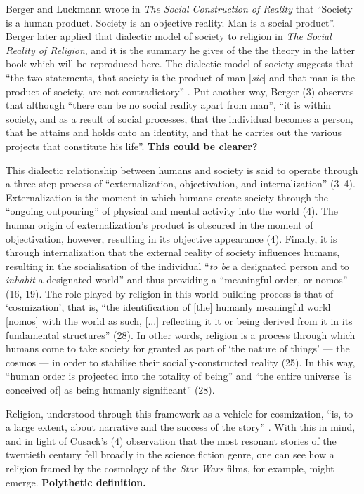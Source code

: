 \documentclass[Draft.tex]{subfiles}
\begin{document}
Berger and Luckmann \parencite*[79]{Berger67} wrote in
\textit{The Social Construction of Reality} that
``Society is a human product. Society is an objective reality.
Man is a social product''.
Berger later applied that dialectic model of society to religion
in \textit{The Social Reality of Religion},
and it is the summary he gives of the the theory
in the latter book which will be reproduced here.
The dialectic model of society suggests that
``the two statements, that society is the product of man
[\textit{sic}] and that
man is the product of society, are not contradictory''
\parencite[3]{Berger69}.
Put another way, Berger (3) observes that although
``there can be no social reality apart from man'',
``it is within society, and as a result of social processes,
that the individual becomes a person,
that he attains and holds onto an identity,
and that he carries out the various projects that constitute his life''.
\textbf{This could be clearer?}

This dialectic relationship between humans and society is said to operate
through a three-step process of
``externalization, objectivation, and internalization'' (3--4).
Externalization is the moment in which humans create society
through the ``ongoing outpouring'' of physical and mental activity
into the world (4).
The human origin of externalization's product is obscured
in the moment of objectivation, however,
resulting in its objective appearance (4).
Finally, it is through internalization that the external
reality of society influences humans, resulting in
the socialisation of the individual
``\textit{to be} a designated person
and to \textit{inhabit} a designated world''
and thus providing a ``meaningful order, or nomos'' (16, 19).
The role played by religion in this world-building process
is that of `cosmization', that is,
``the identification of [the] humanly meaningful world [nomos]
with the world as such, [...] reflecting it it or being derived from it
in its fundamental structures'' (28).
In other words, religion is a process through which humans
come to take society for granted as part of `the nature of things'
--- the cosmos --- in order to stabilise their socially-constructed reality (25).
In this way, ``human order is projected into the totality of being''
and ``the entire universe [is conceived of] as being humanly significant'' (28).

Religion, understood through this framework as a vehicle for cosmization,
``is, to a large extent, about narrative
and the success of the story'' \parencite[4]{Cusack10}.
With this in mind, and in light of Cusack's (4) observation
that the most resonant stories of the twentieth century
fell broadly in the science fiction genre,
one can see how a religion framed by the cosmology of
the \textit{Star Wars} films, for example, might emerge.
\textbf{Polythetic definition.}
\end{document}

